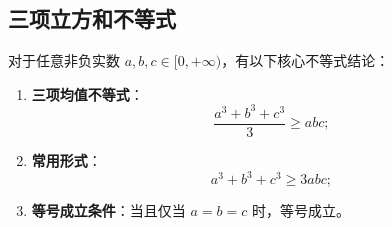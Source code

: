 \subsection{三项立方和不等式}

\Conclusion

对于任意非负实数 \(a, b, c \in [0, +\infty)\)，有以下核心不等式结论：

\begin{enumerate}
    \item \textbf{三项均值不等式}：
    \[ \frac{a^3 + b^3 + c^3}{3} \geq abc; \]

    \item \textbf{常用形式}：
    \[ a^3 + b^3 + c^3 \geq 3abc; \]

    \item \textbf{等号成立条件}：当且仅当 \(a = b = c\) 时，等号成立。
\end{enumerate}